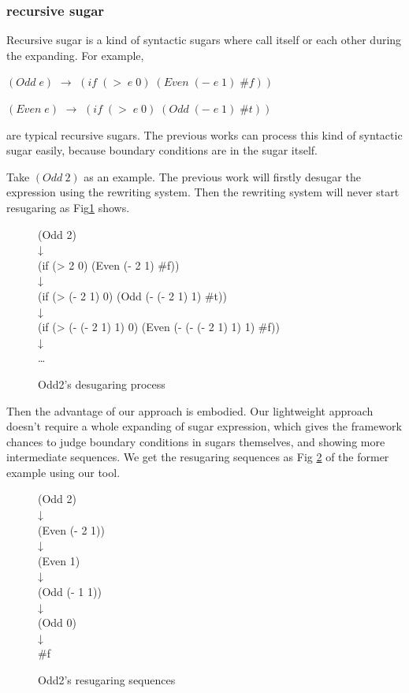 \subsubsection{recursive sugar}
Recursive sugar is a kind of syntactic sugars where call itself or each other during the expanding. For example,

$(Odd\;e)$ $\rightarrow$ $(if\;(>\;e\;0)\;(Even\;(-\;e\;1)\;\#f))$

$(Even\;e)$ $\rightarrow$ $(if\;(>\;e\;0)\;(Odd\;(-\;e\;1)\;\#t))$

are typical recursive sugars. The previous works can process this kind of syntactic sugar easily, because boundary conditions are in the sugar itself.

Take $(Odd~2)$ as an example. The previous work will firstly desugar the expression using the rewriting system. Then the rewriting system will never start resugaring as Fig\ref{fig:odd} shows.

\begin{figure}[ht]
	\centering
	\parbox[t]{\textwidth}{
				\begin{center}
				{
					\small\selectfont
					(Odd 2)\\
					↓\\
					(if (> 2 0) (Even (- 2 1) \#f))\\
					↓\\
					(if (> (- 2 1) 0) (Odd (- (- 2 1) 1) \#t))\\
					↓\\
					(if (> (- (- 2 1) 1) 0) (Even (- (- (- 2 1) 1) 1) \#f))\\
					↓\\
					{\ldots}
				}
				\end{center}

			}
	\caption{Odd2's desugaring process}
\label{fig:odd}
\end{figure}

Then the advantage of our approach is embodied. Our lightweight approach doesn't require a whole expanding of sugar expression, which gives the framework chances to judge boundary conditions in sugars themselves, and showing more intermediate sequences. We get the resugaring sequences as Fig \ref{fig:rec} of the former example using our tool.

\begin{figure}[ht]
	\centering
	\parbox[t]{\textwidth}{
				\begin{center}
				{
					\small\selectfont
					(Odd 2)\\
					↓\\
					(Even (- 2 1))\\
					↓\\
					(Even 1)\\
					↓\\
					(Odd (- 1 1))\\
					↓\\
					(Odd 0)\\
					↓\\
					\#f
				}
				\end{center}

			}
	\caption{Odd2's resugaring sequences}
\label{fig:rec}
\end{figure}

